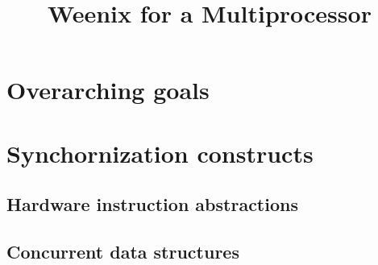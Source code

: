 \documentclass{article}
\begin{document}
\title{Weenix for a  Multiprocessor}

\maketitle

\section{Overarching goals}

\section{Synchornization constructs}

\subsection{Hardware instruction abstractions}

\subsection{Concurrent data structures}
\end{document}
